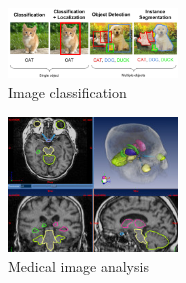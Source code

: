\documentclass[11pt]{beamer}
\begin{document}
	\begin{frame}
		\begin{figure}[h!]
			\includegraphics[width=0.4\textwidth]{img_classify.jpeg}
			\caption{Image classification}
		\end{figure}
		\begin{figure}[h!]
			\includegraphics[width=0.4\textwidth]{medical_analysis.jpg}
			\caption{Medical image analysis}
		\end{figure}
	\end{frame}
	
\end{document}
